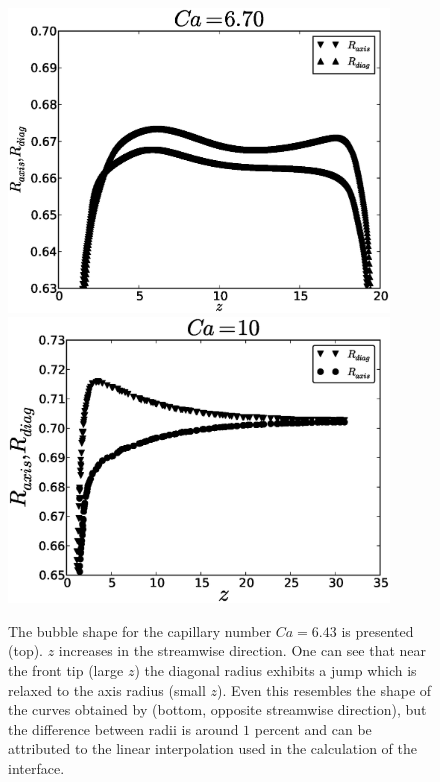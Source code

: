 \documentclass[preprint,12pt]{elsarticle}
\begin{document}
\begin{figure}[ht]
\includegraphics[width=0.9\textwidth]{bubble_ca_large.eps}\\
\includegraphics[width=0.9\textwidth]{bubble_heil_ca10.eps}
\caption{The bubble shape for the capillary number $Ca=6.43$ is presented (top). $z$ increases in
the
streamwise direction. One can see that near the front tip (large $z$) the diagonal radius exhibits
a jump which is relaxed to the axis radius (small $z$).{\color{red} Even this resembles
the shape of the curves obtained by \citet{heil-threedim} (bottom, opposite streamwise direction),
but the
difference between radii is around $1$ percent and can be attributed to
the linear interpolation used in the calculation of the interface.}\label{fig:bubble:ca:large}}
\end{figure}
\end{document}
